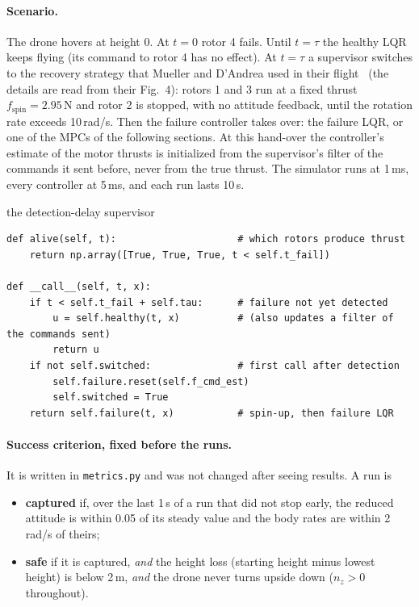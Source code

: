 \paragraph{Scenario.} The drone hovers at height 0. At $t=0$ rotor 4 fails. Until $t=\tau$ the healthy LQR keeps flying (its command to rotor 4 has no effect). At $t=\tau$ a supervisor switches to the recovery strategy that Mueller and D'Andrea used in their flight~\cite{mueller2014stability} (the details are read from their Fig.~4): rotors 1 and 3 run at a fixed thrust $f_{\text{spin}} = 2.95$\,N and rotor 2 is stopped, with no attitude feedback, until the rotation rate exceeds 10\,rad/s. Then the failure controller takes over: the failure LQR, or one of the MPCs of the following sections. At this hand-over the controller's estimate of the motor thrusts is initialized from the supervisor's filter of the commands it sent before, never from the true thrust. The simulator runs at 1\,ms, every controller at 5\,ms, and each run lasts 10\,s.

\begin{codebox}{the detection-delay supervisor}
\begin{lstlisting}
def alive(self, t):                     # which rotors produce thrust
    return np.array([True, True, True, t < self.t_fail])

def __call__(self, t, x):
    if t < self.t_fail + self.tau:      # failure not yet detected
        u = self.healthy(t, x)          # (also updates a filter of the commands sent)
        return u
    if not self.switched:               # first call after detection
        self.failure.reset(self.f_cmd_est)
        self.switched = True
    return self.failure(t, x)           # spin-up, then failure LQR
\end{lstlisting}
\end{codebox}

\paragraph{Success criterion, fixed before the runs.} It is written in \texttt{metrics.py} and was not changed after seeing results. A run is
\begin{itemize}
  \item \textbf{captured} if, over the last 1\,s of a run that did not stop early, the reduced attitude is within 0.05 of its steady value and the body rates are within 2\,rad/s of theirs;
  \item \textbf{safe} if it is captured, \emph{and} the height loss (starting height minus lowest height) is below 2\,m, \emph{and} the drone never turns upside down ($n_z > 0$ throughout).
\end{itemize}


